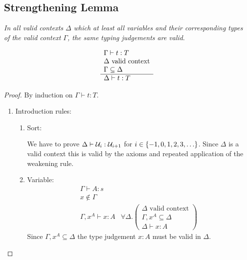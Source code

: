 \subsection{Strengthening Lemma}

\begin{lemma}
    \label{Strengthening}
    \emph{In all valid contexts $\Delta$ which at least all variables and their
    corresponding types of the valid context $\Gamma$, the same typing
    judgements are valid}.

    $$
    \begin{array}{l} 
        \Gamma \vdash t : T
        \\
        \Delta \text{ valid context}
        \\
        \Gamma \subseteq \Delta
     \\ \hline 
        \Delta \vdash t: T
    \end{array}
    $$

    \begin{proof} By induction on $\Gamma \vdash t: T$.
        {
            \newcommand{\subgoal}[4] {
                \begin{array}{l}
                    {#1} \text { valid context}
                    \\
                    {#2} \subseteq {#1}
                    \\
                    \hline
                    {#1} \vdash {#3}: {#4}
                \end{array}
            }
            \newcommand{\goal}[4] {
                \forall #1. \left( {\subgoal{#1}{#2}{#3}{#4}} \right)
            }
        \begin{enumerate}
            \item Introduction rules:
            \begin{enumerate}
                \item Sort:

                We have to prove $\Delta \vdash {\cal U}_i : {\cal U}_{i+1}$ for $i \in
                    {\{-1, 0, 1, 2, 3, \ldots\}}$. Since $\Delta$ is a valid
                    context this is valid by the axioms and repeated application
                    of the weakening rule.

                \item Variable:
                $$
                \begin{array}{l|l}
                    \Gamma \vdash A: s
                    \\
                    x \notin \Gamma
                    \\
                    \hline
                    \Gamma, x^A \vdash x : A
                    &
                    \goal \Delta {\Gamma,x^A} x A
                \end{array}
                $$
                Since $\Gamma,x^A \subseteq \Delta$ the type judgement $x: A$
                    must be valid in $\Delta$.


\end{enumerate}
\end{enumerate}}
\end{proof}
\end{lemma}
